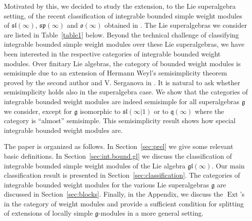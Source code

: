 \documentclass[12pt]{amsart}
\newcommand\g{\mathfrak{g}}
\newcommand\fq{\mathfrak{q}}
\newcommand\fsl{\mathfrak{sl}}
\newcommand\fsp{\mathfrak{sp}}
\newcommand\fo{\mathfrak{o}}
\newcommand\fgl{\mathfrak{gl}}
\DeclareMathOperator{\Ext}{Ext}
\theoremstyle{plain}
\theoremstyle{definition}
\numberwithin{equation}{section}
\begin{document}
Motivated by this, we decided to study the extension, to the Lie superalgebra setting, of the recent classification of integrable bounded simple weight modules of $\fsl(\infty)$, $\fsp(\infty)$ and $\fo(\infty)$ obtained in \cite{GP20}. The Lie superalgebras we consider are listed in Table~\ref{table1} below. Beyond the technical challenge of classifying integrable bounded simple weight modules over these Lie superalgebras, we have been interested in the respective categories of integrable bounded weight modules. Over finitary Lie algebras, the category of bounded weight modules is semisimple due to an extension of Hermann Weyl's semisimplicity theorem proved by the second author and V. Serganova in \cite{PS11}. It is natural to ask whether semisimplicity holds also in the superalgebra case. We show that the categories of integrable bounded weight modules are indeed semisimple for all superalgebras $\g$ we consider, except for $\g$ isomorphic to $\fsl(\infty | 1)$ or to $\fq(\infty)$ where the category is ``almost'' semisimple. This semisimplicity result shows how special integrable bounded weight modules are.

The paper is organized as follows. In Section~\ref{sec:prel} we give some relevant basic definitions. In Section~\ref{sec:int.bound.gl} we discuss the classification of integrable bounded simple weight modules of the Lie algebra $\fgl(\infty)$. Our main classification result is presented in Section~\ref{sec:classification}. The categories of integrable bounded weight modules for the various Lie superalgebras $\g$ are discussed in Section~\ref{sec:blocks}. Finally, in the Appendix, we discuss the $\Ext$'s in the category of weight modules and provide a sufficient condition for splitting of extensions of locally simple $\g$-modules in a more general setting.

\medskip
\end{document}
